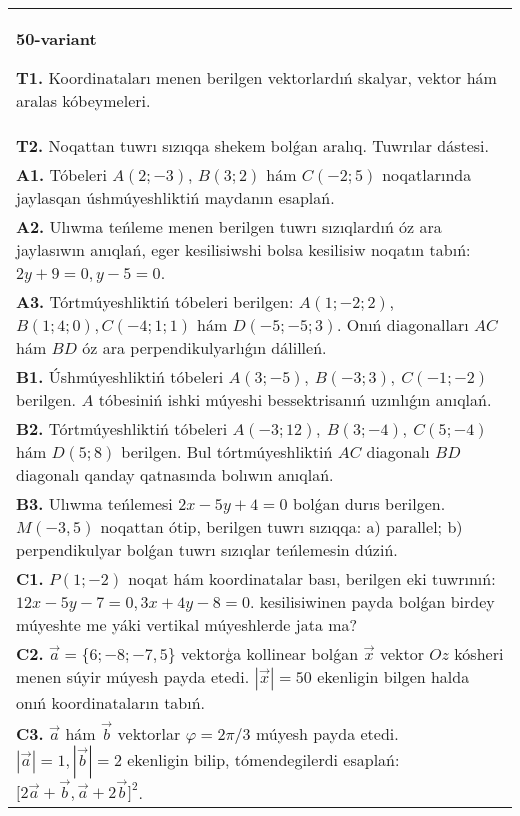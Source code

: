 \documentclass{article}
\begin{document}
\begin{tabular}{m{17cm}}
\textbf{50-variant}

\textbf{T1.} 
Koordinataları menen berilgen vektorlardıń skalyar, vektor hám aralas kóbeymeleri.
 \\
\textbf{T2.} 
Noqattan tuwrı sızıqqa shekem bolǵan aralıq. Tuwrılar dástesi.
 \\
\textbf{A1.} 
Tóbeleri $A (2;-3) $, $B (3;2) $ hám $C (-2;5) $
noqatlarında jaylasqan úshmúyeshliktiń maydanın esaplań.
 \\
\textbf{A2.} 
Ulıwma teńleme menen berilgen tuwrı sızıqlardıń
óz ara jaylasıwın anıqlań, eger kesilisiwshi bolsa kesilisiw noqatın
tabıń: $2y+9=0, y-5=0$.
 \\
\textbf{A3.} 
Tórtmúyeshliktiń tóbeleri berilgen:
$A (1; - 2;2) $, $B (1;4;0),C (- 4;1;1) $ hám $D (- 5; -5;3) $. Onıń diagonalları $AC$ hám $BD$ óz ara
perpendikulyarlıǵın dálilleń.
 \\
\textbf{B1.} 
Úshmúyeshliktiń tóbeleri
\(A (3;-5),\ B (-3;3),\ C (-1;-2) \) berilgen. $A$ tóbesiniń ishki
múyeshi bessektrisanıń uzınlıǵın anıqlań.
 \\
\textbf{B2.} 
Tórtmúyeshliktiń tóbeleri
\(A (-3;12),\ B (3;-4),\ C (5;-4) \) hám \(D (5;8) \) berilgen. Bul
tórtmúyeshliktiń $AC$ diagonalı $BD$ diagonalı qanday
qatnasında bolıwın anıqlań.
 \\
\textbf{B3.} 
Ulıwma teńlemesi \(2x-5y+4=0\) bolǵan durıs
berilgen. \(M (-3,5) \) noqattan ótip, berilgen tuwrı sızıqqa: a) parallel;
b) perpendikulyar bolǵan tuwrı sızıqlar teńlemesin dúziń.
 \\
\textbf{C1.} 
\(P (1;-2) \) noqat hám koordinatalar bası, berilgen eki
tuwrınıń: $12x-5y-7=0, 3x+4y-8=0$.
kesilisiwinen payda bolǵan birdey múyeshte me yáki vertikal
múyeshlerde jata ma?
 \\
\textbf{C2.} 
$\vec{a} = \{ 6; - 8; - 7,5\}$ vektorģa kollinear bolǵan $\vec{x}$ vektor $Oz$ kósheri menen súyir múyesh payda etedi. $|\vec{x}| = 50$ ekenligin bilgen halda onıń koordinataların tabıń.
 \\
\textbf{C3.} 
$\vec{a}$ hám $\vec{b}$ vektorlar $\varphi = 2\pi/3$ múyesh payda etedi. $|\vec{a}| = 1,|\vec{b}| = 2$ ekenligin bilip, tómendegilerdi esaplań:
$\lbrack 2\overrightarrow{a} + \overrightarrow{b},\overrightarrow{a} + 2\overrightarrow{b}\rbrack^{2}$.
 \\

\end{tabular}
\vspace{1cm}
\end{document}

